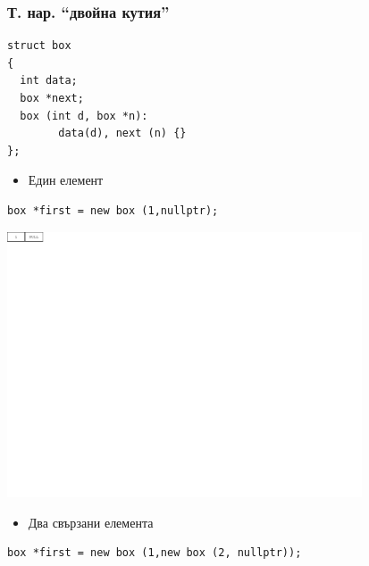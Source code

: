 \documentclass{beamer}
\begin{document}
\begin{frame}[fragile]
\frametitle{Т. нар. ``двойна кутия''}

\begin{flushleft}
\begin{lstlisting}
struct box
{
  int data;
  box *next;
  box (int d, box *n):
        data(d), next (n) {}
};
\end{lstlisting}  
\end{flushleft}

\begin{itemize}
  \item  Един елемент
\end{itemize}

\begin{flushleft}
\begin{lstlisting}
box *first = new box (1,nullptr);
\end{lstlisting}  
\end{flushleft}

\includegraphics[width=10.5cm]{images/01_llbox_onebox.pdf}

\vspace{-210px}

\begin{itemize}
  \item  Два свързани елемента
\end{itemize}

\begin{flushleft}
\begin{lstlisting}
box *first = new box (1,new box (2, nullptr));
\end{lstlisting}  
\end{flushleft}


\end{frame}
\end{document}
